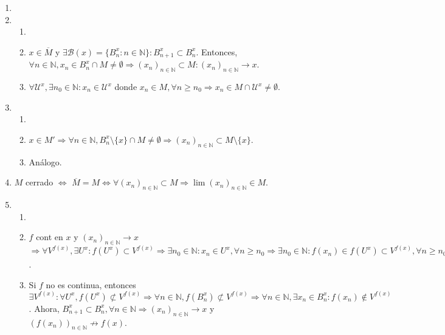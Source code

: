 \begin{dem}
  \begin{enumerate}[label=(\roman*)]
    \item
    \item
      \begin{enumerate}[label=(\roman*)]
        \item []
        \item [$(\Rightarrow)$] $x \in \overline{M}$ y $\exists \mathcal{B}(x) = \{  B_{n}^{x} :  n \in \mathbb{N} \} : B_{n+1}^{x} \subset B_{n}^{x}$. Entonces, $\forall n \in \mathbb{N}, x_{n} \in B_{n}^{x} \cap M \neq \emptyset \Rightarrow ( x_{n} )_{n \in \mathbb{N}} \subset M : ( x_{n} )_{n \in \mathbb{N}} \rightarrow x$.
        \item [$(\Leftarrow)$] $\forall \mathcal{U}^{x}, \exists n_{0} \in \mathbb{N}: x_{n} \in \mathcal{U}^{x}$ donde $x_{n} \in M , \forall n \geq n_{0} \Rightarrow x_{n} \in M \cap \mathcal{U}^{x} \neq \emptyset$.
      \end{enumerate}
    \item
      \begin{enumerate}[label=(\roman*)]
        \item []
        \item [$(\Rightarrow)$] $x \in M' \Rightarrow \forall n \in \mathbb{N}, B_{n}^{x} \setminus \{ x \} \cap M \neq \emptyset \Rightarrow ( x_{n} )_{n \in \mathbb{N}} \subset M \setminus \{ x \}$.
        \item [$(\Leftarrow)$] Análogo.
      \end{enumerate}
    \item $M$ cerrado $\Leftrightarrow$ $\overline{M} = M \Leftrightarrow \forall ( x_{n} )_{n \in \mathbb{N}} \subset M \Rightarrow \lim ( x_{n} )_{n \in \mathbb{N}} \in M$.
    \item 
      \begin{enumerate}[label=(\roman*)]
        \item []
        \item [$(\Rightarrow)$] $f$ cont en $x$ y $ ( x_{n} )_{n \in \mathbb{N}} \rightarrow x$ $\Rightarrow \forall V^{f(x)}, \exists U^{x} : f(U^{x}) \subset V^{f(x)} \Rightarrow \exists n_{0} \in \mathbb{N} :  x_{n} \in U^{x}, \forall n \geq n_{0} \Rightarrow \exists n_{0} \in \mathbb{N}: f(x_{n}) \in f(U^{x}) \subset V^{f(x)}, \forall n \geq n_{0} \Rightarrow ( f(x_{n}) )_{n \in \mathbb{N}} \rightarrow f(x)$.
        \item [$(\Leftarrow)$] Si $f$ no es continua, entonces $\exists V^{f(x)} : \forall U^{x}, f(U^{x}) \not \subset V^{f(x)} \Rightarrow \forall n \in \mathbb{N}, f(B_{n}^{x}) \not \subset V^{f(x)} \Rightarrow \forall n \in \mathbb{N}, \exists x_{n} \in B_{n}^{x}: f(x_{n}) \not \in V^{f(x)}$. Ahora, $B_{n+1}^{x} \subset B_{n}^{x}, \forall n \in \mathbb{N} \Rightarrow ( x_{n} )_{n \in \mathbb{N}} \rightarrow x$ y $( f(x_{n}) )_{n \in \mathbb{N}} \not \rightarrow f(x)$.
      \end{enumerate}
  \end{enumerate}
\end{dem}

